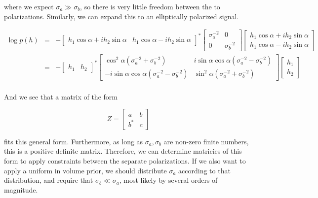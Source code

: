 \documentclass[10pt]{article}
\begin{document}
where we expect $\sigma_a \gg \sigma_b$, so there is very little freedom between the to polarizations. Similarly, we can expand this to an elliptically polarized signal.

\begin{eqnarray}
\log p(h) & = & - \begin{bmatrix} h_1\cos\alpha +ih_2\sin\alpha & h_1\cos\alpha -ih_2\sin\alpha \end{bmatrix}^\ast \begin{bmatrix} \sigma_a^{-2} & 0 \\ 0 & \sigma_b^{-2} \end{bmatrix} \begin{bmatrix} h_1\cos\alpha +ih_2\sin\alpha \\ h_1\cos\alpha -ih_2\sin\alpha \end{bmatrix} \\
          & = & - \begin{bmatrix} h_1 & h_2 \end{bmatrix}^\ast \begin{bmatrix} \cos^2\alpha \left(\sigma_a^{-2} + \sigma_b^{-2}\right) & i\sin\alpha\cos\alpha\left(\sigma_a^{-2} - \sigma_b^{-2}\right) \\ -i\sin\alpha\cos\alpha\left(\sigma_a^{-2} - \sigma_b^{-2}\right) & \sin^2\alpha \left(\sigma_a^{-2} + \sigma_b^{-2}\right) \end{bmatrix} \begin{bmatrix} h_1 \\ h_2 \end{bmatrix} \\
\end{eqnarray}

And we see that a matrix of the form

\begin{equation}
Z = \begin{bmatrix} a & b \\ b^\ast & c \end{bmatrix}
\end{equation}

fits this general form. Furthermore, as long as $\sigma_a,\sigma_b$ are non-zero finite numbers, this is a positive definite matrix. Therefore, we can determine matricies of this form to apply constraints between the separate polarizations. If we also want to apply a uniform in volume prior, we should distribute $\sigma_a$ according to that distribution, and require that $\sigma_b\ll\sigma_a$, most likely by several orders of magnitude.
\end{document}

